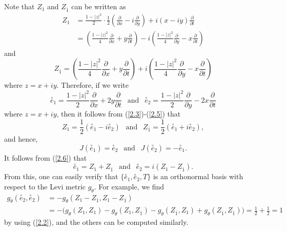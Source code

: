 \documentclass{amsart}
\theoremstyle{Corollary}
\numberwithin{equation}{section}
\begin{document}
Note that $Z_1$ and $Z_{\overline{1}}$ can be written as 
\begin{equation}\label{2.3}
\begin{split}
Z_1&=\frac{1-|z|^2}{2}\cdot\frac{1}{2}\left(\frac{\partial}{\partial x}-i\frac{\partial}{\partial y}\right)
+i(x-iy)\frac{\partial}{\partial t}\\
&=\left(\frac{1-|z|^2}{4}\frac{\partial}{\partial x}+y\frac{\partial}{\partial t}\right)
-i\left(\frac{1-|z|^2}{4}\frac{\partial}{\partial y}-x\frac{\partial}{\partial t}\right)
\end{split}
\end{equation}
and 
\begin{equation}\label{2.4}
Z_{\overline{1}}=\left(\frac{1-|z|^2}{4}\frac{\partial}{\partial x}+y\frac{\partial}{\partial t}\right)
+i\left(\frac{1-|z|^2}{4}\frac{\partial}{\partial y}-x\frac{\partial}{\partial t}\right)
\end{equation}
where $z=x+iy$. 
Therefore, if we write 
\begin{equation}\label{2.5}
\overset{\circ}{e}_1=\frac{1-|z|^2}{2}\frac{\partial}{\partial x}+2y\frac{\partial}{\partial t} 
~~\mbox{ and }~~\overset{\circ}{e}_2= \frac{1-|z|^2}{2}\frac{\partial}{\partial y}-2x\frac{\partial}{\partial t}
\end{equation}
where $z=x+iy$, 
then it follows from (\ref{2.3})-(\ref{2.5}) that 
\begin{equation}\label{2.6}
Z_1=\frac{1}{2}(\overset{\circ}{e}_1-i\overset{\circ}{e}_2)~~\mbox{ and }~~Z_{\overline{1}}=\frac{1}{2}(\overset{\circ}{e}_1+i\overset{\circ}{e}_2),
\end{equation}
and hence, 
\begin{equation}\label{2.8}
J(\overset{\circ}{e}_1)=\overset{\circ}{e}_2~~\mbox{ and }~~J(\overset{\circ}{e}_2)=-\overset{\circ}{e}_1.
\end{equation}
It follows from (\ref{2.6}) that 
\begin{equation}\label{2.7}
\overset{\circ}{e}_1=Z_1+Z_{\overline{1}}~~\mbox{ and }~~
\overset{\circ}{e}_2=i(Z_1-Z_{\overline{1}}).
\end{equation}
From this, one can easily verify that $\{\overset{\circ}{e}_1,\overset{\circ}{e}_2,T\}$ is an orthonormal basis 
with respect to the Levi metric $g_\theta$. 
For example, we find 
\begin{equation*}
\begin{split}
g_\theta(\overset{\circ}{e}_2,\overset{\circ}{e}_2)
&=-g_\theta(Z_1-Z_{\overline{1}},Z_1-Z_{\overline{1}})\\
&=-\big(g_\theta(Z_1,Z_1)-g_\theta(Z_1,Z_{\overline{1}})-g_\theta(Z_{\overline{1}},Z_1)+g_\theta(Z_{\overline{1}},Z_{\overline{1}})\big)
=\frac{1}{2}+\frac{1}{2}=1
\end{split}
\end{equation*}
by using (\ref{2.2}), and the others can be computed similarly. 
\end{document}
